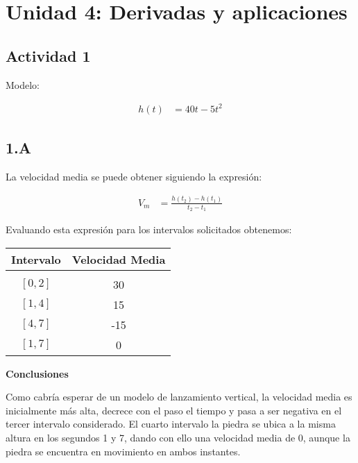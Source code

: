 \section*{Unidad 4: Derivadas y aplicaciones}
\subsection*{Actividad 1}

Modelo:

\begin{align*}
	h(t) &= 40t - 5t^2
\end{align*}

\subsection*{1.A}

La velocidad media se puede obtener siguiendo la expresión:

\begin{align*}
	V_m &= \frac{h(t_2) - h(t_1)}{t_2 - t_1}
\end{align*}

Evaluando esta expresión para los intervalos solicitados obtenemos:

\begin{center}
\begin{tabular}{ c c }
	Intervalo	&	Velocidad Media \\
	\hline \\
	$[0, 2]$	&	30\\	
	$[1, 4]$	&	15\\
	$[4, 7]$	&	-15\\
	$[1, 7]$	&	0
\end{tabular}
\end{center}

\textbf{Conclusiones}

Como cabría esperar de un modelo de lanzamiento vertical, la velocidad media 
es inicialmente más alta, decrece con el paso el tiempo y 
pasa a ser negativa en el tercer intervalo considerado. 
El cuarto intervalo la piedra se ubica a la misma altura en los segundos 1 y 7,
dando con ello una velocidad media de 0, aunque la piedra se encuentra en 
movimiento en ambos instantes.
